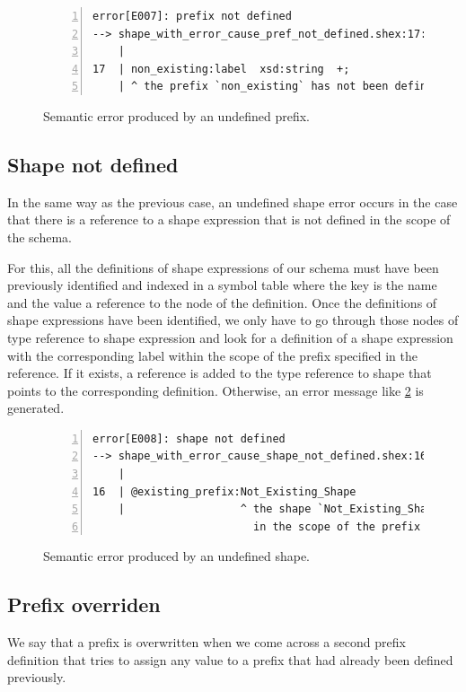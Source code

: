 \begin{figure}
    \begin{lstlisting}[numbers=left,basicstyle=\ttfamily\scriptsize]
error[E007]: prefix not defined
--> shape_with_error_cause_pref_not_defined.shex:17:3
    |
17  | non_existing:label  xsd:string  +;
    | ^ the prefix `non_existing` has not been defined
    \end{lstlisting}
    \caption[Semantic error produced by an undefined prefix]{Semantic error produced by an undefined prefix.}
    \label{fig:err-non-def-pref}
\end{figure}

\subsection{Shape not defined}
In the same way as the previous case, an undefined shape error occurs in the case that there is a reference to a shape
expression that is not defined in the scope of the schema.

For this, all the definitions of shape expressions of our schema must have been previously identified and indexed in
a symbol table where the key is the name and the value a reference to the node of the definition. Once the definitions
of shape expressions have been identified, we only have to go through those nodes of type reference to shape expression
and look for a definition of a shape expression with the corresponding label within the scope of the prefix specified
in the reference. If it exists, a reference is added to the type reference to shape that points to the corresponding
definition. Otherwise, an error message like \cref{fig:err-non-def-shape} is generated.

\begin{figure}
    \begin{lstlisting}[numbers=left,basicstyle=\ttfamily\scriptsize]
error[E008]: shape not defined
--> shape_with_error_cause_shape_not_defined.shex:16:13
    |
16  | @existing_prefix:Not_Existing_Shape
    |                  ^ the shape `Not_Existing_Shape` has not been defined
                         in the scope of the prefix `existing_prefix`
    \end{lstlisting}
    \caption[Semantic error produced by an undefined shape]{Semantic error produced by an undefined shape.}
    \label{fig:err-non-def-shape}
\end{figure}

\subsection{Prefix overriden}
We say that a prefix is overwritten when we come across a second prefix definition that tries to assign any
value to a prefix that had already been defined previously.

